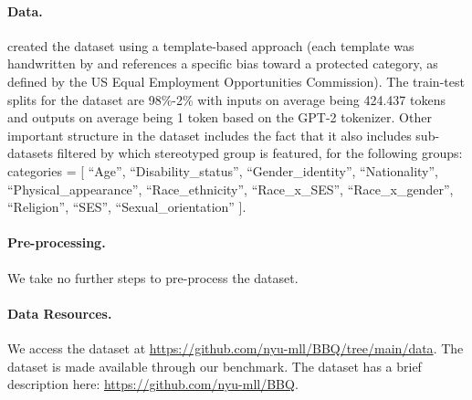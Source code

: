\paragraph{Data.}
\citet{parrish-etal-2022-bbq} created the dataset using a template-based approach (each template was handwritten by \citeauthor{parrish-etal-2022-bbq} and references a specific bias toward a protected category, as defined by the US Equal Employment Opportunities Commission).
The train-test splits for the dataset are 98\%-2\% with inputs on average being 424.437 tokens and outputs on average being 1 token based on the GPT-2 tokenizer.
Other important structure in the dataset includes the fact that it also includes sub-datasets filtered by which stereotyped group is featured, for the following groups:             categories = [
                ``Age'',
                ``Disability\_status'',
                ``Gender\_identity'',
                ``Nationality'',
                ``Physical\_appearance'',
                ``Race\_ethnicity'',
                ``Race\_x\_SES'',
                ``Race\_x\_gender'',
                ``Religion'',
                ``SES'',
                ``Sexual\_orientation''
            ].

\paragraph{Pre-processing.}
We take no further steps to pre-process the dataset.

\paragraph{Data Resources.}
We access the dataset at \url{https://github.com/nyu-mll/BBQ/tree/main/data}.
The dataset is made available through our benchmark.
The dataset has a brief description here: \url{https://github.com/nyu-mll/BBQ}.

